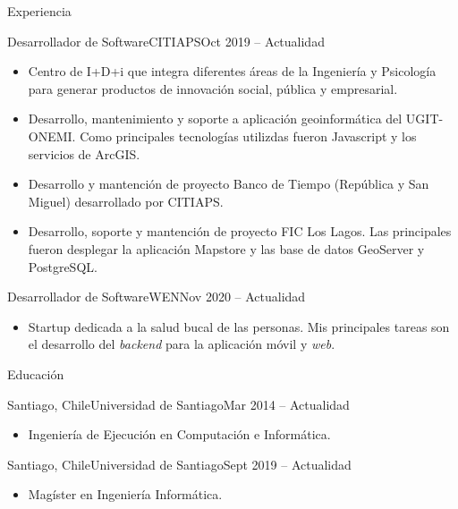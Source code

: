 \documentclass[]{mcdowellcv}
\begin{document}
	\makeheader
	
	\begin{cvsection}{Experiencia}
		\begin{cvsubsection}{Desarrollador de Software}{CITIAPS}{Oct 2019 -- Actualidad}
			\begin{itemize}
				\item Centro de I+D+i que integra diferentes áreas de la Ingeniería y Psicología para generar productos de innovación social, pública y empresarial.
				\item Desarrollo, mantenimiento y soporte a aplicación geoinformática del UGIT-ONEMI. Como principales tecnologías utilizdas fueron Javascript y los servicios de ArcGIS.
				\item Desarrollo y mantención de proyecto Banco de Tiempo (República y San Miguel) desarrollado por CITIAPS.
				\item Desarrollo, soporte y mantención de proyecto FIC Los Lagos. Las principales fueron desplegar la aplicación Mapstore y las base de datos GeoServer y PostgreSQL.  
			\end{itemize}
		\end{cvsubsection}
		
		\begin{cvsubsection}{Desarrollador de Software}{WEN}{Nov 2020 -- Actualidad}		
			\begin{itemize}
				\item Startup dedicada a la salud bucal de las personas. Mis principales tareas son el desarrollo del \textit{backend} para la aplicación móvil y \textit{web}.
			\end{itemize}
		\end{cvsubsection}
	\end{cvsection}
	
	\begin{cvsection}{Educación}
		\begin{cvsubsection}{Santiago, Chile}{Universidad de Santiago}{Mar 2014 -- Actualidad}
			\begin{itemize}
				\item Ingeniería de Ejecución en Computación e Informática.
			\end{itemize}
		\end{cvsubsection}
		\begin{cvsubsection}{Santiago, Chile}{Universidad de Santiago}{Sept 2019 -- Actualidad}
			\begin{itemize}
				\item Magíster en Ingeniería Informática.
			\end{itemize}
		\end{cvsubsection}
	\end{cvsection}
	
\end{document}
